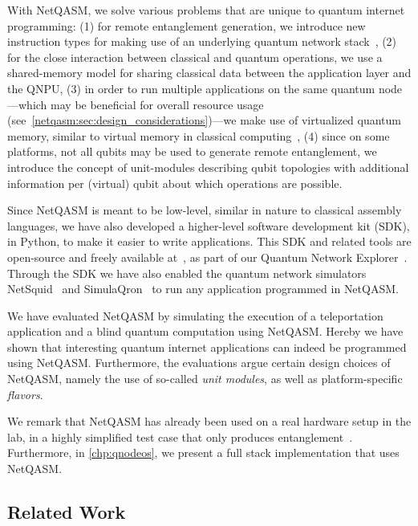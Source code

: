 With \ac{NetQASM}, we solve various problems that are unique to quantum internet programming:
    (1) for remote entanglement generation, we introduce new instruction types for making use of an underlying quantum network stack~\cite{dahlberg2019linklayer, kozlowski2020networklayer},
    (2) for the close interaction between classical and quantum operations, we use a shared-memory model for sharing classical data between the application layer and the \ac{QNPU},
    (3) in order to run multiple applications on the same quantum node---which may be beneficial for overall resource usage (see~\cref{netqasm:sec:design_considerations})---we make use of virtualized quantum memory, similar to virtual memory in classical computing~\cite{arpaci2018operating},
    (4) since on some platforms, not all qubits may be used to generate remote entanglement, we introduce the concept of unit-modules describing qubit topologies with additional information per (virtual) qubit about which operations are possible.

Since \ac{NetQASM} is meant to be low-level, similar in nature to classical assembly languages, we have also developed a higher-level software development kit (SDK), in Python, to make it easier to write applications.
This SDK and related tools are open-source and freely available at~\cite{git_netqasm}, as part of our Quantum Network Explorer~\cite{qne_website}.
Through the SDK we have also enabled the quantum network simulators NetSquid~\cite{coopmans2021netsquid} and SimulaQron~\cite{dahlberg2018simulaqron} to run any application programmed in \ac{NetQASM}.

We have evaluated \ac{NetQASM} by simulating the execution of a teleportation application and a blind quantum computation using \ac{NetQASM}.
Hereby we have shown that interesting quantum internet applications can indeed be programmed using \ac{NetQASM}.
Furthermore, the evaluations argue certain design choices of \ac{NetQASM}, namely the use of so-called \textit{unit modules}, as well as platform-specific
\textit{flavors}.

We remark that \ac{NetQASM} has already been used on a real hardware setup in the lab, in a highly simplified test case that only produces entanglement~\cite{pompili2021experimental}.
Furthermore, in \cref{chp:qnodeos}, we present a full stack implementation that uses \ac{NetQASM}.


\subsection{Related Work}
\label{netqasm:sec:related}

